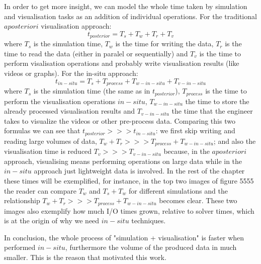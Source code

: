In order to get more insight, we can model the whole time taken by simulation
and visualisation tasks as an addition of individual operations. For the
traditional $a posteriori$ visualisation approach:
\[
  t_{posterior} = T_s + T_w  + T_r + T_v
\]
where $T_s$ is the simulation time, $T_w$ is the time for writing the data,
$T_r$ is the time to read the data (either in paralel or sequentially) and $T_v$
is the time to perform visalisation operations and probably write visualisation
results (like videos or graphs). For the in-situ approach:
\[
t_{in-situ} = T_s + T_{process} + T_{w-in-situ} + T_{v-in-situ}
\]
where $T_s$ is the simulation time (the same as in $t_{posterior}$),
$T_{process}$
is the time to perform the visualisation operations $in-situ$, $T_{w-in-situ}$
the time to store the already processed visualisation results and
$T_{v-in-situ}$ the time that the engineer takes to visualize the videos or
other pre-process data. Comparing this two formulas we can see that
$t_{posterior} >>> t_{in-situ}$: we first skip writing and reading large volumes
of data, $T_w  + T_r >>> T_{process} + T_{w-in-situ}$; and also the
visualisation time is reduced $T_v >>> T_{v-in-situ}$ because, in the $a
posteriori$ approach, visualising means performing operations on large data
while in the $in-situ$ approach just lightweight data is involved.  In the rest
of the chapter these times will be exemplified, for instance, in the top two
images of figure 5555 the reader can compare $T_w$ and $T_s + T_w$ for different
simulations and the relationship $T_w  + T_r >>> T_{process} + T_{w-in-situ}$
becomes clear. These two images also exemplify how much I/O times grown,
relative to solver times, which is at the origin of why we need $in-situ$
techniques.

In conclusion, the whole process of "simulation + visualisation" is faster when
performed $in-situ$, furthermore the volume of the produced data in much
smaller. This is the reason that motivated this work.




